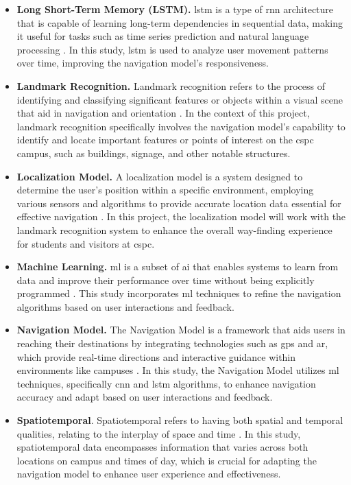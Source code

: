 \begin{refsection}
\begin{itemize}
    \item \textbf{Long Short-Term Memory (LSTM).} \gls{lstm} is a type of \gls{rnn} architecture that is capable of learning long-term dependencies in sequential data, making it useful for tasks such as time series prediction and natural language processing \cite{15}. In this study, \gls{lstm} is used to analyze user movement patterns over time, improving the navigation model's responsiveness.
    
    \item \textbf{Landmark Recognition.} Landmark recognition refers to the process of identifying and classifying significant features or objects within a visual scene that aid in navigation and orientation \cite{16}. In the context of this project, landmark recognition specifically involves the navigation model's capability to identify and locate important features or points of interest on the \gls{cspc} campus, such as buildings, signage, and other notable structures.
    
    \item \textbf{Localization Model.} A localization model is a system designed to determine the user's position within a specific environment, employing various sensors and algorithms to provide accurate location data essential for effective navigation \cite{17}. In this project, the localization model will work with the landmark recognition system to enhance the overall way-finding experience for students and visitors at \gls{cspc}.
    
    \item \textbf{Machine Learning.} \gls{ml} is a subset of \gls{ai} that enables systems to learn from data and improve their performance over time without being explicitly programmed \cite{18}. This study incorporates \gls{ml} techniques to refine the navigation algorithms based on user interactions and feedback.
    
    \item \textbf{Navigation Model.} The Navigation Model is a framework that aids users in reaching their destinations by integrating technologies such as \gls{gps} and \gls{ar}, which provide real-time directions and interactive guidance within environments like campuses \cite{19}. In this study, the Navigation Model utilizes \gls{ml} techniques, specifically \gls{cnn} and \gls{lstm} algorithms, to enhance navigation accuracy and adapt based on user interactions and feedback.
    
    \item \textbf{Spatiotemporal}. Spatiotemporal refers to having both spatial and temporal qualities, relating to the interplay of space and time \cite{20}. In this study, spatiotemporal data encompasses information that varies across both locations on campus and times of day, which is crucial for adapting the navigation model to enhance user experience and effectiveness. 
    

\end{itemize}
\end{refsection}
